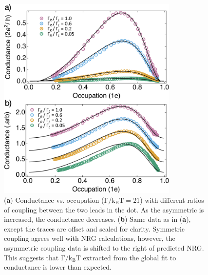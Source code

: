 \begin{figure}[ht]
  \begin{center}
    \includegraphics[width=0.8\textwidth]{figures/ch3/crop_FiguresMaster.019.png}
    \caption[Conductance vs. Occupation : Varying the coupling symmetry between quantum dot and leads]{\label{fig:ch3/cond_occ_assymetry} 
    (\textbf{a}) Conductance vs. occupation ($\mathrm{\Gamma/k_BT=21}$) with different ratios of coupling between the two leads in the dot. As the asymmetric is increased, the conductance decreases.
    (\textbf{b}) Same data as in (\textbf{a}), except the traces are offset and scaled for clarity. Symmetric coupling agrees well with NRG calculations, however, the asymmetric coupling data is shifted to the right of predicted NRG. This suggests that $\mathrm{\Gamma/k_BT}$ extracted from the global fit to conductance is lower than expected. }
  \end{center}
\end{figure}